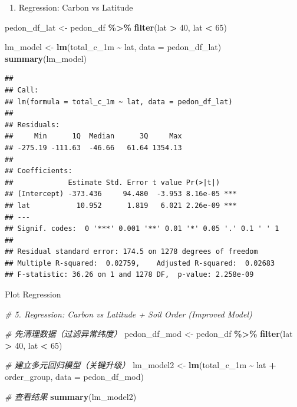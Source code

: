 \documentclass[
]{article}
\newenvironment{Shaded}{\begin{snugshade}}{\end{snugshade}}
\newcommand{\AttributeTok}[1]{\textcolor[rgb]{0.13,0.29,0.53}{#1}}
\newcommand{\CommentTok}[1]{\textcolor[rgb]{0.56,0.35,0.01}{\textit{#1}}}
\newcommand{\DecValTok}[1]{\textcolor[rgb]{0.00,0.00,0.81}{#1}}
\newcommand{\FunctionTok}[1]{\textcolor[rgb]{0.13,0.29,0.53}{\textbf{#1}}}
\newcommand{\NormalTok}[1]{#1}
\newcommand{\OtherTok}[1]{\textcolor[rgb]{0.56,0.35,0.01}{#1}}
\newcommand{\SpecialCharTok}[1]{\textcolor[rgb]{0.81,0.36,0.00}{\textbf{#1}}}
\providecommand{\tightlist}{%
  \setlength{\itemsep}{0pt}\setlength{\parskip}{0pt}}
\begin{document}
\begin{enumerate}
\def\labelenumi{\arabic{enumi}.}
\setcounter{enumi}{4}
\tightlist
\item
  Regression: Carbon vs Latitude
\end{enumerate}

\begin{Shaded}
\begin{Highlighting}[]
\NormalTok{pedon\_df\_lat }\OtherTok{\textless{}{-}}\NormalTok{ pedon\_df }\SpecialCharTok{\%\textgreater{}\%}
  \FunctionTok{filter}\NormalTok{(lat }\SpecialCharTok{\textgreater{}} \DecValTok{40}\NormalTok{, lat }\SpecialCharTok{\textless{}} \DecValTok{65}\NormalTok{)}

\NormalTok{lm\_model }\OtherTok{\textless{}{-}} \FunctionTok{lm}\NormalTok{(total\_c\_1m }\SpecialCharTok{\textasciitilde{}}\NormalTok{ lat, }\AttributeTok{data =}\NormalTok{ pedon\_df\_lat)}
\FunctionTok{summary}\NormalTok{(lm\_model)}
\end{Highlighting}
\end{Shaded}

\begin{verbatim}
## 
## Call:
## lm(formula = total_c_1m ~ lat, data = pedon_df_lat)
## 
## Residuals:
##     Min      1Q  Median      3Q     Max 
## -275.19 -111.63  -46.66   61.64 1354.13 
## 
## Coefficients:
##             Estimate Std. Error t value Pr(>|t|)    
## (Intercept) -373.436     94.480  -3.953 8.16e-05 ***
## lat           10.952      1.819   6.021 2.26e-09 ***
## ---
## Signif. codes:  0 '***' 0.001 '**' 0.01 '*' 0.05 '.' 0.1 ' ' 1
## 
## Residual standard error: 174.5 on 1278 degrees of freedom
## Multiple R-squared:  0.02759,    Adjusted R-squared:  0.02683 
## F-statistic: 36.26 on 1 and 1278 DF,  p-value: 2.258e-09
\end{verbatim}

Plot Regression

\begin{Shaded}
\begin{Highlighting}[]
\CommentTok{\# 5. Regression: Carbon vs Latitude + Soil Order (Improved Model)}

\CommentTok{\# 先清理数据（过滤异常纬度）}
\NormalTok{pedon\_df\_mod }\OtherTok{\textless{}{-}}\NormalTok{ pedon\_df }\SpecialCharTok{\%\textgreater{}\%}
  \FunctionTok{filter}\NormalTok{(lat }\SpecialCharTok{\textgreater{}} \DecValTok{40}\NormalTok{, lat }\SpecialCharTok{\textless{}} \DecValTok{65}\NormalTok{)}

\CommentTok{\# 建立多元回归模型（关键升级）}
\NormalTok{lm\_model2 }\OtherTok{\textless{}{-}} \FunctionTok{lm}\NormalTok{(total\_c\_1m }\SpecialCharTok{\textasciitilde{}}\NormalTok{ lat }\SpecialCharTok{+}\NormalTok{ order\_group, }\AttributeTok{data =}\NormalTok{ pedon\_df\_mod)}

\CommentTok{\# 查看结果}
\FunctionTok{summary}\NormalTok{(lm\_model2)}
\end{Highlighting}
\end{Shaded}
\end{document}
